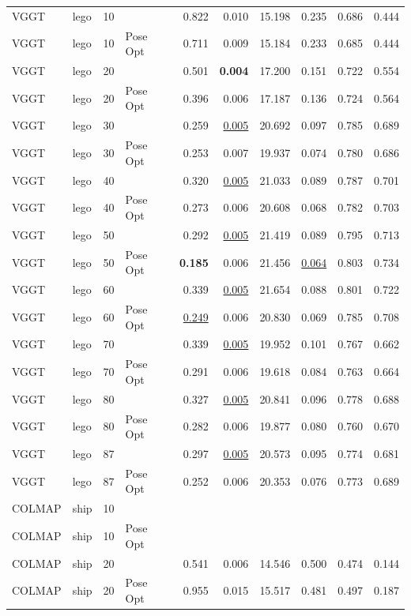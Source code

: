 \begin{table}[H]
\begin{tabular}{llrlrrrrrr}
VGGT & lego & 10 &  & 0.822 & 0.010 & 15.198 & 0.235 & 0.686 & 0.444 \\
VGGT & lego & 10 & Pose Opt & 0.711 & 0.009 & 15.184 & 0.233 & 0.685 & 0.444 \\
VGGT & lego & 20 &  & 0.501 & \textbf{0.004} & 17.200 & 0.151 & 0.722 & 0.554 \\
VGGT & lego & 20 & Pose Opt & 0.396 & 0.006 & 17.187 & 0.136 & 0.724 & 0.564 \\
VGGT & lego & 30 &  & 0.259 & \underline{0.005} & 20.692 & 0.097 & 0.785 & 0.689 \\
VGGT & lego & 30 & Pose Opt & 0.253 & 0.007 & 19.937 & 0.074 & 0.780 & 0.686 \\
VGGT & lego & 40 &  & 0.320 & \underline{0.005} & 21.033 & 0.089 & 0.787 & 0.701 \\
VGGT & lego & 40 & Pose Opt & 0.273 & 0.006 & 20.608 & 0.068 & 0.782 & 0.703 \\
VGGT & lego & 50 &  & 0.292 & \underline{0.005} & 21.419 & 0.089 & 0.795 & 0.713 \\
VGGT & lego & 50 & Pose Opt & \textbf{0.185} & 0.006 & 21.456 & \underline{0.064} & 0.803 & 0.734 \\
VGGT & lego & 60 &  & 0.339 & \underline{0.005} & 21.654 & 0.088 & 0.801 & 0.722 \\
VGGT & lego & 60 & Pose Opt & \underline{0.249} & 0.006 & 20.830 & 0.069 & 0.785 & 0.708 \\
VGGT & lego & 70 &  & 0.339 & \underline{0.005} & 19.952 & 0.101 & 0.767 & 0.662 \\
VGGT & lego & 70 & Pose Opt & 0.291 & 0.006 & 19.618 & 0.084 & 0.763 & 0.664 \\
VGGT & lego & 80 &  & 0.327 & \underline{0.005} & 20.841 & 0.096 & 0.778 & 0.688 \\
VGGT & lego & 80 & Pose Opt & 0.282 & 0.006 & 19.877 & 0.080 & 0.760 & 0.670 \\
VGGT & lego & 87 &  & 0.297 & \underline{0.005} & 20.573 & 0.095 & 0.774 & 0.681 \\
VGGT & lego & 87 & Pose Opt & 0.252 & 0.006 & 20.353 & 0.076 & 0.773 & 0.689 \\
\midrule
COLMAP & ship & 10 &  &  &  &  &  &  &  \\
COLMAP & ship & 10 & Pose Opt &  &  &  &  &  &  \\
COLMAP & ship & 20 &  & 0.541 & 0.006 & 14.546 & 0.500 & 0.474 & 0.144 \\
COLMAP & ship & 20 & Pose Opt & 0.955 & 0.015 & 15.517 & 0.481 & 0.497 & 0.187 \\

\end{tabular}
\end{table}
